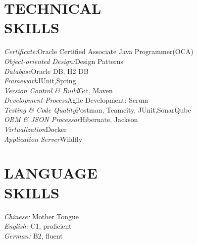 \documentclass[margin, 10pt]{res} %
\begin{document}
\begin{resume}

% 
%

\section{TECHNICAL \\ SKILLS} 

{\sl Certificate:}\hfill		Oracle Certified Associate Java Programmer(OCA)\\
{\sl Object-oriented Design:}\hfill 		Design Patterns\\
{\sl Database}\hfill 							Oracle DB, H2 DB\\ 
{\sl Framework}\hfill  						JUnit,Spring\\
{\sl Version Control \& Build}\hfill 		Git, Maven\\
{\sl Development Process}\hfill 			Agile Development: Scrum\\
{\sl Testing \& Code Quality}\hfill 		Postman, Teamcity, JUnit,SonarQube\\
{\sl ORM \& JSON Processor}\hfill 					Hibernate, Jackson\\
{\sl Virtualization}\hfill 								 	Docker\\
{\sl Application Server}\hfill 							Wildfly


\section{LANGUAGE \\ SKILLS} 
{\sl Chinese:} 	\hfill	Mother Tongue \\
{\sl English:} 		\hfill   C1, proficient\\
{\sl German:} 	\hfill	B2, fluent


\end{resume}
\end{document}
